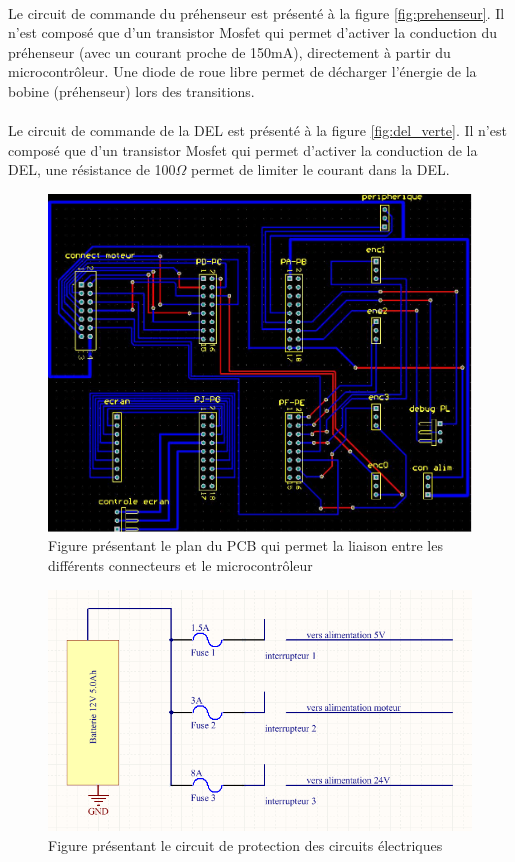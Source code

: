\paragraph{}Le circuit de commande du préhenseur est présenté à la figure \ref{fig:prehenseur}. Il n'est composé que d'un transistor Mosfet qui permet d'activer la conduction du préhenseur (avec un courant proche de 150mA), directement à partir du microcontrôleur. Une diode de roue libre permet de décharger l'énergie de la bobine (préhenseur) lors des transitions.
\paragraph{}Le circuit de commande de la DEL est présenté à la figure \ref{fig:del_verte}. Il n'est composé que d'un transistor Mosfet qui permet d'activer la conduction de la DEL, une résistance de 100$\Omega$ permet de limiter le courant dans la DEL.

\begin{figure}
\centering
\includegraphics[scale=0.5]{fig/plan_micro.jpg}
\caption{Figure présentant le plan du PCB qui permet la liaison entre les différents connecteurs et le microcontrôleur}
\label{fig:plan_micro}
\end{figure}

\begin{figure}
\centering
\includegraphics[scale=0.5]{fig/plan_circuit_protection.png}
\caption{Figure présentant le circuit de protection des circuits électriques}
\label{fig:protection}
\end{figure}

